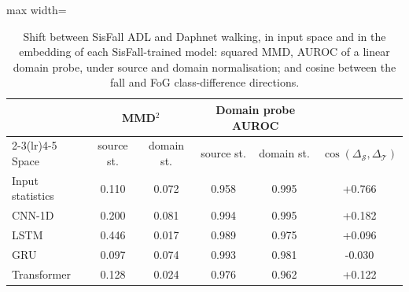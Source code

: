 \begin{table}[ht]
\centering
\footnotesize
\caption{Shift between SisFall ADL and Daphnet walking, in input space and in the embedding of each SisFall-trained model: squared MMD, AUROC of a linear domain probe, under source and domain normalisation; and cosine between the fall and FoG class-difference directions.}
\label{tab:shift}
\setlength{\tabcolsep}{4pt}
\begin{adjustbox}{max width=\textwidth}
\begin{tabular}{lccccc}
\toprule
 & \multicolumn{2}{c}{MMD$^2$} & \multicolumn{2}{c}{Domain probe AUROC} & \\
\cmidrule(lr){2-3}\cmidrule(lr){4-5}
Space & source st. & domain st. & source st. & domain st. & $\cos(\Delta_\mathcal{S},\Delta_\mathcal{T})$ \\
\midrule
Input statistics & 0.110 & 0.072 & 0.958 & 0.995 & +0.766 \\
CNN-1D & 0.200 & 0.081 & 0.994 & 0.995 & +0.182 \\
LSTM & 0.446 & 0.017 & 0.989 & 0.975 & +0.096 \\
GRU & 0.097 & 0.074 & 0.993 & 0.981 & -0.030 \\
Transformer & 0.128 & 0.024 & 0.976 & 0.962 & +0.122 \\
\bottomrule
\end{tabular}
\end{adjustbox}
\end{table}